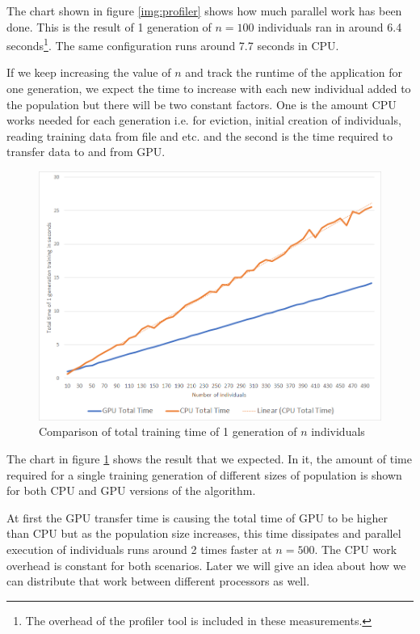 \documentclass[twocolumn]{article}
\begin{document}
The chart shown in figure \ref{img:profiler} shows how much parallel work has been done. This is the result of 1 generation of $n=100$ individuals ran in around 6.4 seconds\footnote{The overhead of the profiler tool is included in these measurements.}. The same configuration runs around 7.7 seconds in CPU.

If we keep increasing the value of $n$ and track the runtime of the application for one generation, we expect the time to increase with each new individual added to the population but there will be two constant factors. One is the amount CPU works needed for each generation i.e. for eviction, initial creation of individuals, reading training data from file and etc. and the second is the time required to transfer data to and from GPU.

\begin{figure}
    \centering \includegraphics[width=\textwidth]{IndivTotal}
    \caption{Comparison of total training time of 1 generation of $n$ individuals}
    \label{img:IndivTotal}
\end{figure}

The chart in figure \ref{img:IndivTotal} shows the result that we expected. In it, the amount of time required for a single training generation of different sizes of population is shown for both CPU and GPU versions of the algorithm.

At first the GPU transfer time is causing the total time of GPU to be higher than CPU but as the population size increases, this time dissipates and parallel execution of individuals runs around 2 times faster at $n=500$. The CPU work overhead is constant for both scenarios. Later we will give an idea about how we can distribute that work between different processors as well.
\end{document}
